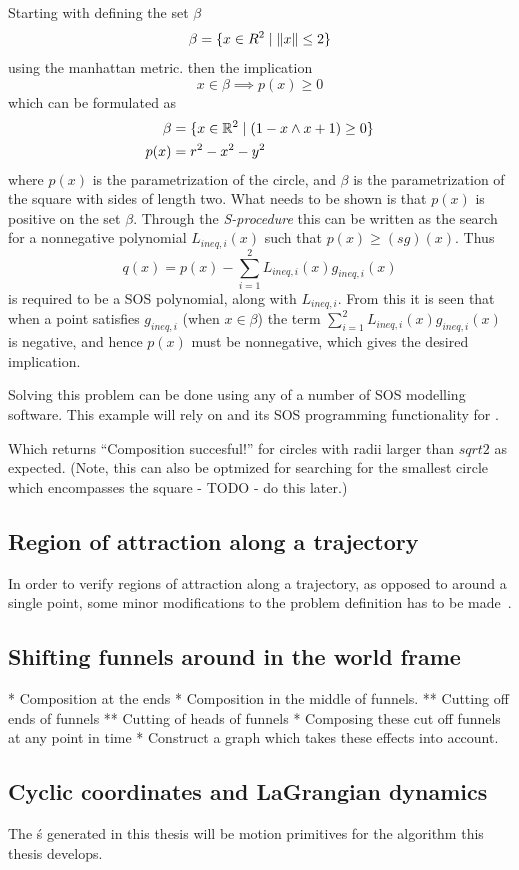 Starting with defining the set \(\beta\)
\[
  \beta = \lbrace x \in R^2 \mid \lVert x\rVert \leq 2\rbrace
\]
using the manhattan metric. then the implication
\[
  x \in \beta \implies p(x) \geq 0
\]
which can be formulated as
\begin{align*}
  \beta &= \lbrace x \in \mathbb{R}^2 \mid (1 - x \wedge x + 1) \geq 0\rbrace \\
  p(x) &= r^2 - x^2 - y^2
\end{align*}
where \(p(x)\) is the parametrization of the circle, and \(\beta\) is the
parametrization of the square with sides of length two. What needs to be shown
is that \(p(x)\) is positive on the set \(\beta\). Through the
\textit{S-procedure} this can be written as the search for a nonnegative
polynomial \(L_{ineq,i}(x)\) such that \(p(x) \geq \left( sg \right)(x)\). Thus
\[
  q(x) = p(x) - \sum_{i=1}^{2}L_{ineq,i}(x)g_{ineq,i}(x)
\]
is required to be a \ac{SOS} polynomial, along with \(L_{ineq,i}\). From this it
is seen that when a point satisfies \(g_{ineq,i}\) (\ie when \(x \in \beta\))
the term \(\sum_{i=1}^{2}L_{ineq,i}(x)g_{ineq,i}(x)\) is negative, and hence
\(p(x)\) must be nonnegative, which gives the desired implication.

Solving this problem can be done using any of a number of \ac{SOS} modelling
software. This example will rely on \cite[Yalmip]{Lofberg2004} and its \ac{SOS}
programming functionality \cite{Lofberg2009} for \matlab.




Which returns ``Composition succesful!'' for circles with radii larger than
\(sqrt{2}\) as expected. (Note, this can also be optmized for searching for the
smallest circle which encompasses the square - TODO - do this later.)

\subsection{Region of attraction along a trajectory}

In order to verify regions of attraction along a trajectory, as opposed to
around a single point, some minor modifications to the problem definition has to
be made~\cite{tobenkinInvariantFunnelsTrajectories2010}.

\subsection{Shifting funnels around in the world frame}

* Composition at the ends * Composition in the middle of funnels. ** Cutting off
ends of funnels ** Cutting of heads of funnels * Composing these cut off funnels
at any point in time * Construct a graph which takes these effects into account.


\subsection{Cyclic coordinates and LaGrangian dynamics}

The \funnel\'s generated in this thesis will be motion primitives for the
\rrtfunnel{} algorithm this thesis develops.


